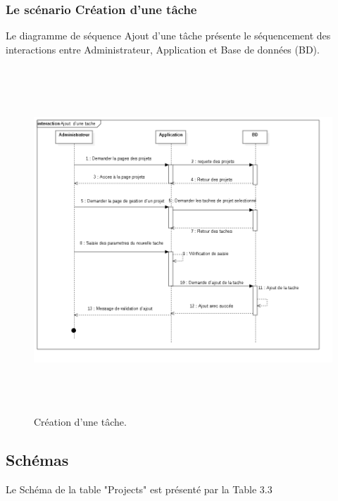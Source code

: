 \newpage
\subsubsection{Le sc\'{e}nario \guillemotleft{} Cr\'{e}ation d'une t\^{a}che\guillemotright{}}
Le diagramme de s\'{e}quence \guillemotleft{} Ajout d'une t\^{a}che \guillemotright{} pr\'{e}sente le s\'{e}quencement
des interactions entre Administrateur, Application et Base de donn\'{e}es (BD).

\begin{figure}[H]
\center
\includegraphics[width=14cm,height=13cm]{./figures/seq/C.png}
\caption{Cr\'{e}ation d'une t\^{a}che.}
\end{figure}



\newpage

\subsection{ Sch\'{e}mas }
Le Sch\'{e}ma de la table "Projects" est pr\'{e}sent\'{e} par la Table 3.3

